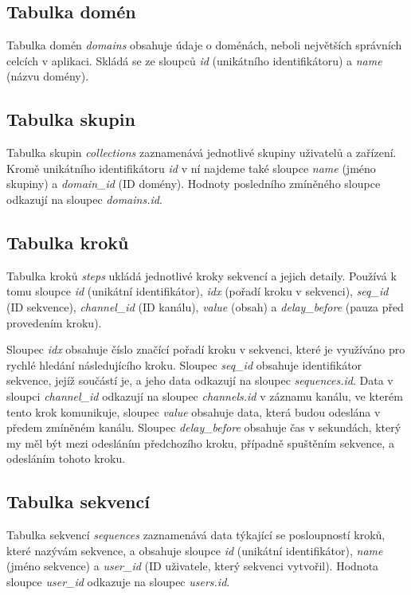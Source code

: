 \subsection{Tabulka domén}

Tabulka domén \emph{domains} obsahuje údaje o doménách, neboli největších správních celcích v aplikaci. Skládá se ze sloupců \emph{id} (unikátního identifikátoru) a \emph{name} (názvu domény).

\subsection{Tabulka skupin}

Tabulka skupin \emph{collections} zaznamenává jednotlivé skupiny uživatelů a zařízení. Kromě unikátního identifikátoru \emph{id} v ní najdeme také sloupce \emph{name} (jméno skupiny) a \emph{domain\_id} (ID domény). Hodnoty posledního zmíněného sloupce odkazují na sloupec \emph{domains.id}.

\subsection{Tabulka kroků}

Tabulka kroků \emph{steps} ukládá jednotlivé kroky sekvencí a jejich detaily. Používá k tomu sloupce \emph{id} (unikátní identifikátor), \emph{idx} (pořadí kroku v sekvenci), \emph{seq\_id} (ID sekvence), \emph{channel\_id} (ID kanálu), \emph{value} (obsah) a \emph{delay\_before} (pauza před provedením kroku).

Sloupec \emph{idx} obsahuje číslo značící pořadí kroku v sekvenci, které je využíváno pro rychlé hledání následujícího kroku. Sloupec \emph{seq\_id} obsahuje identifikátor sekvence, jejíž součástí je, a jeho data odkazují na sloupec \emph{sequences.id}. Data v sloupci \emph{channel\_id} odkazují na sloupec \emph{channels.id} v záznamu kanálu, ve kterém tento krok komunikuje, sloupec \emph{value} obsahuje data, která budou odeslána v předem zmíněném kanálu. Sloupec \emph{delay\_before} obsahuje čas v sekundách, který my měl být mezi odesláním předchozího kroku, případně spuštěním sekvence, a odesláním tohoto kroku.

\subsection{Tabulka sekvencí}

Tabulka sekvencí \emph{sequences} zaznamenává data týkající se posloupností kroků, které nazývám sekvence, a obsahuje sloupce \emph{id} (unikátní identifikátor), \emph{name} (jméno sekvence) a \emph{user\_id} (ID uživatele, který sekvenci vytvořil). Hodnota sloupce \emph{user\_id} odkazuje na sloupec \emph{users.id}.

